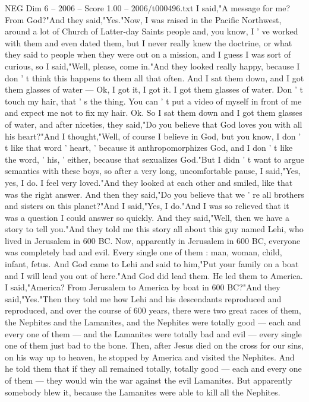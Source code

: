 \begin{textsample}{NEG Dim 6 – 2006 – Score 1.00 – 2006/t000496.txt}
I said,"A message for me?
From God?"And they said,"Yes."Now, I was raised in the Pacific Northwest, around a lot of Church of Latter-day Saints people and, you know, I ' ve worked with them and even dated them, but I never really knew the doctrine, or what they said to people when they were out on a mission, and I guess I was sort of curious, so I said,"Well, please, come in."And they looked really happy, because I don ' t think this happens to them all that often.
And I sat them down, and I got them glasses of water — Ok, I got it, I got it.
I got them glasses of water.
Don ' t touch my hair, that ' s the thing.
You can ' t put a video of myself in front of me and expect me not to fix my hair.
Ok.
So I sat them down and I got them glasses of water, and after niceties, they said,"Do you believe that God loves you with all his heart?"And I thought,"Well, of course I believe in God, but you know, I don ' t like that word ' heart, ' because it anthropomorphizes God, and I don ' t like the word, ' his, ' either, because that sexualizes God."But I didn ' t want to argue semantics with these boys, so after a very long, uncomfortable pause, I said,"Yes, yes, I do.
I feel very loved."And they looked at each other and smiled, like that was the right answer.
And then they said,"Do you believe that we ' re all brothers and sisters on this planet?"And I said,"Yes, I do."And I was so relieved that it was a question I could answer so quickly.
And they said,"Well, then we have a story to tell you."And they told me this story all about this guy named Lehi, who lived in Jerusalem in 600 BC.
Now, apparently in Jerusalem in 600 BC, everyone was completely bad and evil.
Every single one of them : man, woman, child, infant, fetus.
And God came to Lehi and said to him,"Put your family on a boat and I will lead you out of here."And God did lead them.
He led them to America.
I said,"America?
From Jerusalem to America by boat in 600 BC?"And they said,"Yes."Then they told me how Lehi and his descendants reproduced and reproduced, and over the course of 600 years, there were two great races of them, the Nephites and the Lamanites, and the Nephites were totally good — each and every one of them — and the Lamanites were totally bad and evil — every single one of them just bad to the bone.
Then, after Jesus died on the cross for our sins, on his way up to heaven, he stopped by America and visited the Nephites.
And he told them that if they all remained totally, totally good — each and every one of them — they would win the war against the evil Lamanites.
But apparently somebody blew it, because the Lamanites were able to kill all the Nephites.

\end{textsample}
